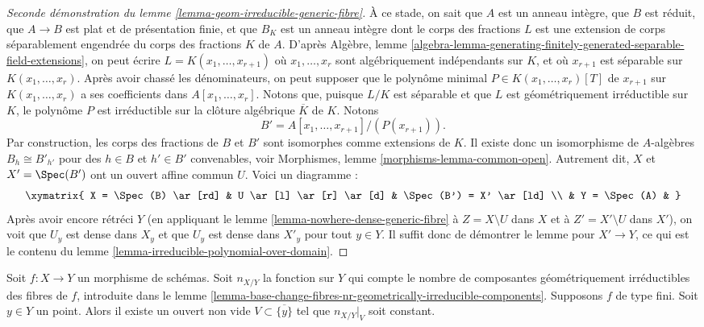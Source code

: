 \begin{proof}[Seconde démonstration du lemme \ref{lemma-geom-irreducible-generic-fibre}]
\medskip\noindent
À ce stade, on sait que $A$ est un anneau intègre, que $B$ est réduit, que $A \to B$
est plat et de présentation finie, et que $B_K$ est un anneau intègre dont le corps des fractions
$L$ est une extension de corps séparablement engendrée du corps des fractions $K$
de $A$. D'après Algèbre, lemme
\ref{algebra-lemma-generating-finitely-generated-separable-field-extensions},
on peut écrire $L = K(x_1, \ldots, x_{r + 1})$
où $x_1, \ldots, x_r$ sont algébriquement indépendants sur $K$, et où
$x_{r + 1}$ est séparable sur $K(x_1, \ldots, x_r)$. Après avoir chassé
les dénominateurs, on peut supposer que le polynôme minimal
$P \in K(x_1, \ldots, x_r)[T]$ de $x_{r + 1}$ sur $K(x_1, \ldots, x_r)$
a ses coefficients dans $A[x_1, \ldots, x_r]$. Notons que, puisque
$L/K$ est séparable et que $L$ est géométriquement irréductible sur
$K$, le polynôme $P$ est irréductible sur la clôture algébrique
$\overline{K}$ de $K$. Notons
$$
B' = A[x_1, \ldots, x_{r + 1}]/(P(x_{r + 1})).
$$
Par construction, les corps des fractions de $B$ et $B'$ sont isomorphes comme
extensions de $K$. Il existe donc un isomorphisme de $A$-algèbres
$B_h \cong B'_{h'}$ pour des $h \in B$ et $h' \in B'$ convenables, voir
Morphismes, lemme \ref{morphisms-lemma-common-open}.
Autrement dit, $X$ et $X' = \Spec(B')$ ont un ouvert affine commun $U$.
Voici un diagramme :
$$
\xymatrix{
X = \Spec(B) \ar[rd] &
U \ar[l] \ar[r] \ar[d] &
\Spec(B') = X' \ar[ld] \\
& Y = \Spec(A) &
}
$$
Après avoir encore rétréci $Y$ (en appliquant le
lemme \ref{lemma-nowhere-dense-generic-fibre}
à $Z = X \setminus U$ dans $X$ et à $Z' = X' \setminus U$ dans $X'$),
on voit que $U_y$ est dense dans $X_y$ et que $U_y$ est dense dans $X'_y$
pour tout $y \in Y$. Il suffit donc de démontrer le lemme pour
$X' \to Y$, ce qui est le contenu du
lemme \ref{lemma-irreducible-polynomial-over-domain}.
\end{proof}

\begin{lemma}
\label{lemma-nr-geom-irreducible-components-good}
Soit $f : X \to Y$ un morphisme de schémas. Soit
$n_{X/Y}$ la fonction sur $Y$ qui compte le nombre de composantes
géométriquement irréductibles des fibres de $f$, introduite dans le
lemme \ref{lemma-base-change-fibres-nr-geometrically-irreducible-components}.
Supposons $f$ de type fini.
Soit $y \in Y$ un point. Alors il existe un ouvert non vide
$V \subset \overline{\{y\}}$ tel que $n_{X/Y}|_V$ soit constant.
\end{lemma}

